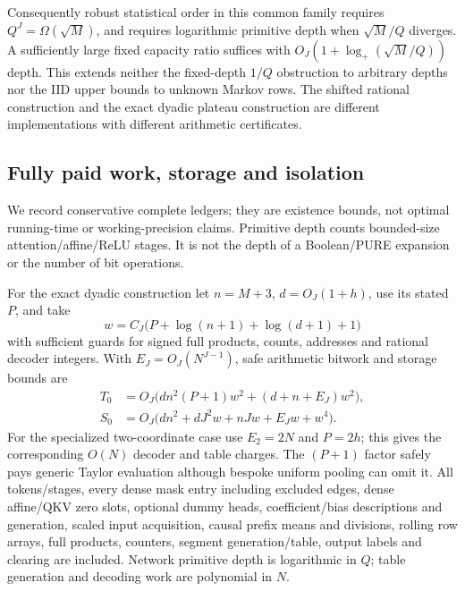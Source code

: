 \documentclass[11pt,letterpaper]{article}
\theoremstyle{definition}\newtheorem{definition}[theorem]{Definition}
\theoremstyle{remark}\newtheorem{remark}[theorem]{Remark}
\begin{document}
Consequently robust statistical order in this common family requires $Q^J=\Omega(\sqrt M)$, and requires logarithmic primitive depth when $\sqrt M/Q$ diverges. A sufficiently large fixed capacity ratio suffices with $O_J(1+\log_+(\sqrt M/Q))$ depth. This extends neither the fixed-depth $1/Q$ obstruction to arbitrary depths nor the IID upper bounds to unknown Markov rows. The shifted rational construction and the exact dyadic plateau construction are different implementations with different arithmetic certificates.

\subsection{Fully paid work, storage and isolation}\label{sec:robustcost}
We record conservative complete ledgers; they are existence bounds, not optimal running-time or working-precision claims. Primitive depth counts bounded-size attention/affine/ReLU stages. It is not the depth of a Boolean/PURE expansion or the number of bit operations.

For the exact dyadic construction let $n=M+3$, $d=O_J(1+h)$, use its stated $P$, and take
\[
 w=C_J\bigl(P+\log(n+1)+\log(d+1)+1\bigr)
\]
with sufficient guards for signed full products, counts, addresses and rational decoder integers. With $E_J=O_J(N^{J-1})$, safe arithmetic bitwork and storage bounds are
\begin{equation}\label{eq:robustdyadiccost}
 \begin{aligned}
 T_0&=O_J\bigl(dn^2(P+1)w^2+(d+n+E_J)w^2\bigr),\\
 S_0&=O_J\bigl(dn^2+dJ^2w+nJw+E_Jw+w^4\bigr).
 \end{aligned}
\end{equation}
For the specialized two-coordinate case use $E_2=2N$ and $P=2h$; this gives the corresponding $O(N)$ decoder and table charges. The $(P+1)$ factor safely pays generic Taylor evaluation although bespoke uniform pooling can omit it. All tokens/stages, every dense mask entry including excluded edges, dense affine/QKV zero slots, optional dummy heads, coefficient/bias descriptions and generation, scaled input acquisition, causal prefix means and divisions, rolling row arrays, full products, counters, segment generation/table, output labels and clearing are included. Network primitive depth is logarithmic in $Q$; table generation and decoding work are polynomial in $N$.
\end{document}
